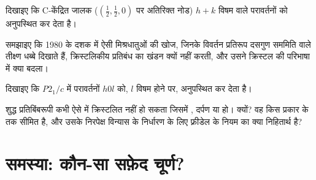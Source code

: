 \begin{exercise}[$\star\star$]\label{exo:b3:x-ray-diffraction:9}
दिखाइए कि C-केंद्रित जालक ($(\frac12,\frac12,0)$ पर अतिरिक्त नोड) $h + k$ विषम वाले
परावर्तनों को अनुपस्थित कर देता है।
\end{exercise}

\begin{exercise}[$\star\star\star$]\label{exo:b3:x-ray-diffraction:10}
समझाइए कि 1980 के दशक में ऐसी मिश्रधातुओं की खोज, जिनके विवर्तन प्रतिरूप दसगुण
सममिति वाले तीक्ष्ण धब्बे दिखाते हैं, क्रिस्टलिकीय प्रतिबंध का खंडन क्यों नहीं करती,
और उसने क्रिस्टल की परिभाषा में क्या बदला।
\end{exercise}

\begin{exercise}[$\star\star\star$]\label{exo:b3:x-ray-diffraction:11}
दिखाइए कि \textit{P}$2_1/c$ में  परावर्तनों $h0l$ को, $l$
विषम होने पर, अनुपस्थित कर देता है।
\end{exercise}

\begin{exercise}[$\star\star\star$]\label{exo:b3:x-ray-diffraction:12}
शुद्ध प्रतिबिंबरूपी कभी ऐसे  में क्रिस्टलित नहीं हो सकता जिसमें
, दर्पण या  हो। क्यों? वह किस प्रकार के  तक
सीमित है, और उसके निरपेक्ष विन्यास के निर्धारण के लिए फ़्रीडेल के नियम का क्या
निहितार्थ है?
\end{exercise}

\clearpage
\enlargethispage{3\baselineskip}
\section{समस्या: कौन-सा सफ़ेद चूर्ण?}

